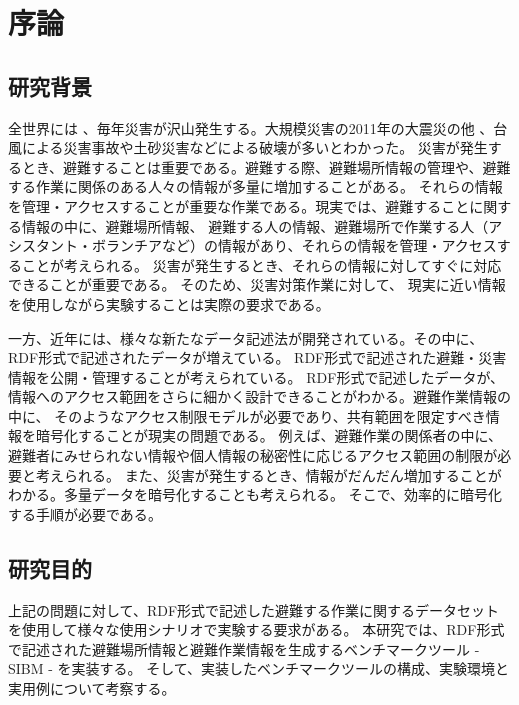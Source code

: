 ﻿%
\chapter{序論}

\section{研究背景}
全世界には 、毎年災害が沢山発生する。大規模災害の2011年の大震災の他 、台風による災害事故や土砂災害などによる破壊が多いとわかった。
災害が発生するとき、避難することは重要である。避難する際、避難場所情報の管理や、避難する作業に関係のある人々の情報が多量に増加することがある。
それらの情報を管理・アクセスすることが重要な作業である。現実では、避難することに関する情報の中に、避難場所情報、
避難する人の情報、避難場所で作業する人（アシスタント・ボランチアなど）の情報があり、それらの情報を管理・アクセスすることが考えられる。
災害が発生するとき、それらの情報に対してすぐに対応できることが重要である。 そのため、災害対策作業に対して、
現実に近い情報を使用しながら実験することは実際の要求である。

一方、近年には、様々な新たなデータ記述法が開発されている。その中に、RDF形式で記述されたデータが増えている。
RDF形式で記述された避難・災害情報を公開・管理することが考えられている\cite{cite:opendata}。
RDF形式で記述したデータが、情報へのアクセス範囲をさらに細かく設計できることがわかる。避難作業情報の中に、
そのようなアクセス制限モデルが必要であり、共有範囲を限定すべき情報を暗号化することが現実の問題である。
例えば、避難作業の関係者の中に、避難者にみせられない情報や個人情報の秘密性に応じるアクセス範囲の制限が必要と考えられる\cite{cite:kodama}。
また、災害が発生するとき、情報がだんだん増加することがわかる。多量データを暗号化することも考えられる。
そこで、効率的に暗号化する手順が必要である\cite{cite:dat}。

\section{研究目的}
上記の問題に対して、RDF形式で記述した避難する作業に関するデータセットを使用して様々な使用シナリオで実験する要求がある。
本研究では、RDF形式で記述された避難場所情報と避難作業情報を生成するベンチマークツール - SIBM - を実装する。
そして、実装したベンチマークツールの構成、実験環境と実用例について考察する。
